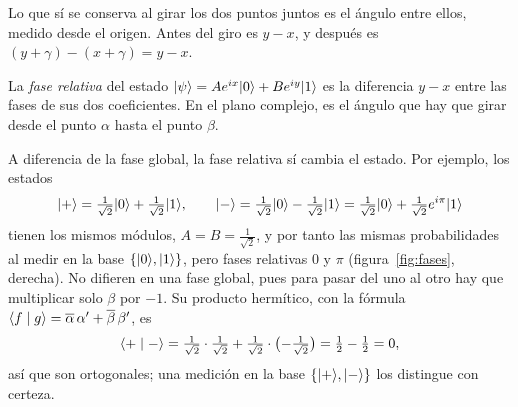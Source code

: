 Lo que sí se conserva al girar los dos puntos juntos es el ángulo entre ellos, medido desde el
origen. Antes del giro es $y-x$, y después es $(y+\gamma)-(x+\gamma)=y-x$.

\begin{definicionT}
La \emph{fase relativa} del estado $\lvert \psi\rangle=Ae^{ix}\lvert 0\rangle+Be^{iy}\lvert 1\rangle$ es la diferencia
$y-x$ entre las fases de sus dos coeficientes. En el plano complejo, es el ángulo que hay que
girar desde el punto $\alpha$ hasta el punto $\beta$.
\end{definicionT}

A diferencia de la fase global, la fase relativa sí cambia el estado. Por ejemplo, los estados
\[
  \lvert +\rangle=\tfrac1{\sqrt2}\lvert 0\rangle+\tfrac1{\sqrt2}\lvert 1\rangle,\qquad
  \lvert -\rangle=\tfrac1{\sqrt2}\lvert 0\rangle-\tfrac1{\sqrt2}\lvert 1\rangle=\tfrac1{\sqrt2}\lvert 0\rangle+\tfrac1{\sqrt2}e^{i\pi}\lvert 1\rangle
\]
tienen los mismos módulos, $A=B=\frac1{\sqrt2}$, y por tanto las mismas probabilidades al medir
en la base $\{\lvert 0\rangle,\lvert 1\rangle\}$, pero fases relativas $0$ y $\pi$ (figura~\ref{fig:fases},
derecha). No difieren en una fase global, pues para pasar del uno al otro hay que multiplicar
solo $\beta$ por $-1$. Su producto hermítico, con la fórmula
$\langle f\mid g\rangle=\overline\alpha\,\alpha'+\overline\beta\,\beta'$, es
\[
  \langle +\mid -\rangle=\tfrac1{\sqrt2}\cdot\tfrac1{\sqrt2}+\tfrac1{\sqrt2}\cdot\bigl(-\tfrac1{\sqrt2}\bigr)
  =\tfrac12-\tfrac12=0 ,
\]
así que son ortogonales; una medición en la base $\{\lvert +\rangle,\lvert -\rangle\}$ los distingue con certeza.


